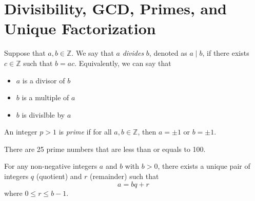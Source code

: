 \section{Divisibility, GCD, Primes, and Unique Factorization}

\begin{definition}[Divisibility]
    Suppose that \(a, b \in \mathbb{Z}\). We say that \(a\) \textit{divides} \(b\), denoted as \(a \mid b\), if there exists \(c \in \mathbb{Z}\) such that \(b = ac\). Equivalently, we can say that
    \begin{itemize}
        \item \(a\) is a divisor of \(b\)
        \item \(b\) is a multiple of \(a\)
        \item \(b\) is divislble by \(a\)
    \end{itemize}
\end{definition}

\begin{definition}
    An integer \(p > 1\) is \textit{prime} if for all \(a, b \in \mathbb{Z}\), then \(a = \pm 1\) or \(b = \pm 1\).
\end{definition}

\begin{distraction}
    There are 25 prime numbers that are less than or equals to 100.
\end{distraction}

\begin{theorem}
    For any non-negative integers \(a\) and \(b\) with \(b > 0\), there exists a unique pair of integers \(q\) (quotient) and \(r\) (remainder) such that
    \[ a = bq + r \]
    where \(0 \leq r \leq b-1\).
\end{theorem}

